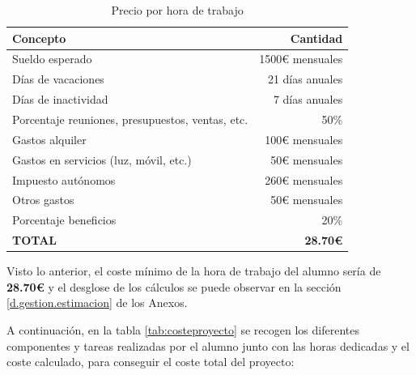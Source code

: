\begin{table}[H]
\centering
\bgroup
\def\arraystretch{1.3}
\begin{tabular}{l r}
\toprule
\textbf{Concepto} & \textbf{Cantidad} \\
 \midrule
 Sueldo esperado
& 
1500€ mensuales
 \\
 Días de vacaciones
& 
21 días anuales
 \\
 Días de inactividad
& 
7 días anuales
 \\
 Porcentaje reuniones, presupuestos, ventas, etc.
& 
50\%
 \\
 Gastos alquiler
& 
100€ mensuales
 \\
 Gastos en servicios (luz, móvil, etc.)
& 
50€ mensuales
 \\
 Impuesto autónomos
& 
260€ mensuales
 \\
 Otros gastos
& 
50€ mensuales
 \\
 Porcentaje beneficios
& 
20\%
\\
 \hline
 \textbf{TOTAL}
& 
\textbf{28.70€}
 \\
\bottomrule
\end{tabular}
\egroup
\caption{Precio por hora de trabajo}
\label{tab:preciohora}
\end{table}

Visto lo anterior, el coste mínimo de la hora de trabajo del alumno sería de \textbf{28.70€} y el desglose de los cálculos se puede observar en la sección \ref{d.gestion.estimacion} de los Anexos.

A continuación, en la tabla \ref{tab:costeproyecto} se recogen los diferentes componentes y tareas realizadas por el alumno junto con las horas dedicadas y el coste calculado, para conseguir el coste total del proyecto: 


